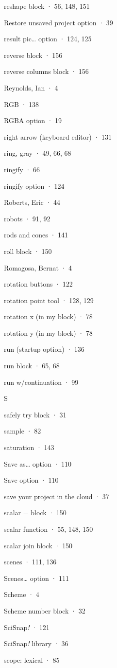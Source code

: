 reshape block · 56, 148, 151

Restore unsaved project option · 39

result pic\ldots{} option · 124, 125

reverse block · 156

reverse columns block · 156

Reynolds, Ian · 4

RGB · 138

RGBA option · 19

right arrow (keyboard editor) · 131

ring, gray · 49, 66, 68

ringify · 66

ringify option · 124

Roberts, Eric · 44

robots · 91, 92

rods and cones · 141

roll block · 150

Romagosa, Bernat · 4

rotation buttons · 122

rotation point tool · 128, 129

rotation x (in my block) · 78

rotation y (in my block) · 78

run (startup option) · 136

run block · 65, 68

run w/continuation · 99

S

safely try block · 31

sample · 82

saturation · 143

Save as\ldots{} option · 110

Save option · 110

save your project in the cloud · 37

scalar = block · 150

scalar function · 55, 148, 150

scalar join block · 150

scenes · 111, 136

Scenes\ldots{} option · 111

Scheme · 4

Scheme number block · 32

SciSnap\emph{!} · 121

SciSnap\emph{!} library · 36

scope: lexical · 85

